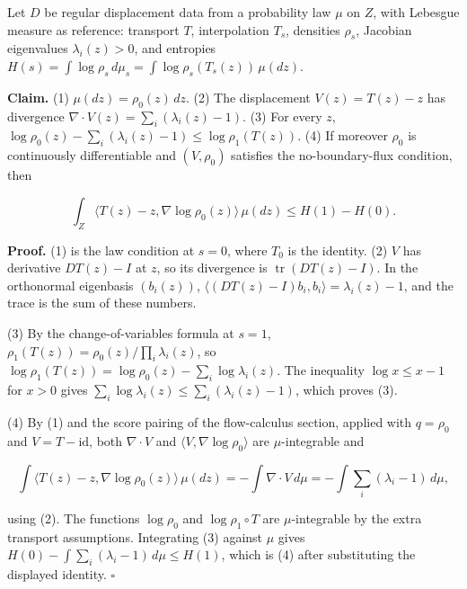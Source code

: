 \documentclass[11pt,a4paper]{report}
\begin{document}
Let \(D\) be regular displacement data from a probability law \(\mu\) on \(Z\), with Lebesgue measure as reference: transport \(T\), interpolation \(T_s\), densities \(\rho_s\), Jacobian eigenvalues \(\lambda_i(z)>0\), and entropies \(H(s)=\int\log\rho_s\,d\mu_s=\int\log\rho_s(T_s(z))\,\mu(dz)\).




\textbf{Claim.} (1) \(\mu(dz)=\rho_0(z)\,dz\). (2) The displacement \(V(z)=T(z)-z\) has divergence \(\nabla\cdot V(z)=\sum_i(\lambda_i(z)-1)\). (3) For every \(z\), \(\log\rho_0(z)-\sum_i(\lambda_i(z)-1)\le\log\rho_1(T(z))\). (4) If moreover \(\rho_0\) is continuously differentiable and \((V,\rho_0)\) satisfies the no-boundary-flux condition, then


\[\int_Z\langle T(z)-z,\nabla\log\rho_0(z)\rangle\,\mu(dz)\le H(1)-H(0).\]


\textbf{Proof.} (1) is the law condition at \(s=0\), where \(T_0\) is the identity. (2) \(V\) has derivative \(DT(z)-I\) at \(z\), so its divergence is \(\operatorname{tr}(DT(z)-I)\). In the orthonormal eigenbasis \((b_i(z))\), \(\langle(DT(z)-I)b_i,b_i\rangle=\lambda_i(z)-1\), and the trace is the sum of these numbers.




(3) By the change-of-variables formula at \(s=1\), \(\rho_1(T(z))=\rho_0(z)/\prod_i\lambda_i(z)\), so \(\log\rho_1(T(z))=\log\rho_0(z)-\sum_i\log\lambda_i(z)\). The inequality \(\log x\le x-1\) for \(x>0\) gives \(\sum_i\log\lambda_i(z)\le\sum_i(\lambda_i(z)-1)\), which proves (3).




(4) By (1) and the score pairing of the flow-calculus section, applied with \(q=\rho_0\) and \(V=T-\mathrm{id}\), both \(\nabla\cdot V\) and \(\langle V,\nabla\log\rho_0\rangle\) are \(\mu\)-integrable and


\[\int\langle T(z)-z,\nabla\log\rho_0(z)\rangle\,\mu(dz)=-\int\nabla\cdot V\,d\mu=-\int\sum_i(\lambda_i-1)\,d\mu,\]


using (2). The functions \(\log\rho_0\) and \(\log\rho_1\circ T\) are \(\mu\)-integrable by the extra transport assumptions. Integrating (3) against \(\mu\) gives \(H(0)-\int\sum_i(\lambda_i-1)\,d\mu\le H(1)\), which is (4) after substituting the displayed identity. \(\square\)
\end{document}
